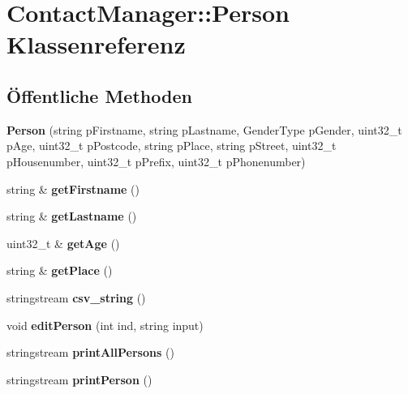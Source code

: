 \hypertarget{classContactManager_1_1Person}{}\section{Contact\+Manager\+:\+:Person Klassenreferenz}
\label{classContactManager_1_1Person}
\subsection*{Öffentliche Methoden}
\begin{DoxyCompactItemize}
\item 
\mbox{\label{classContactManager_1_1Person_ab1082b4e670d792fa0e7089a1834f2a2}} 
{\bfseries Person} (string p\+Firstname, string p\+Lastname, Gender\+Type p\+Gender, uint32\+\_\+t p\+Age, uint32\+\_\+t p\+Postcode, string p\+Place, string p\+Street, uint32\+\_\+t p\+Housenumber, uint32\+\_\+t p\+Prefix, uint32\+\_\+t p\+Phonenumber)
\item 
\mbox{\label{classContactManager_1_1Person_abaf0c8225bed1c63d3fc8edf39c091cb}} 
string \& {\bfseries get\+Firstname} ()
\item 
\mbox{\label{classContactManager_1_1Person_a7be599e567469609abc206c4e20b1ef3}} 
string \& {\bfseries get\+Lastname} ()
\item 
\mbox{\label{classContactManager_1_1Person_a785d2a902e5fb396adf21e3a69718edd}} 
uint32\+\_\+t \& {\bfseries get\+Age} ()
\item 
\mbox{\label{classContactManager_1_1Person_abc73080d9a92362af3ef25183d7186e5}} 
string \& {\bfseries get\+Place} ()
\item 
\mbox{\label{classContactManager_1_1Person_a3bc1692664e68de81b431caa6a77510b}} 
stringstream {\bfseries csv\+\_\+string} ()
\item 
\mbox{\label{classContactManager_1_1Person_a90d0e64d4db9d19843a343c6f9564555}} 
void {\bfseries edit\+Person} (int ind, string input)
\item 
\mbox{\label{classContactManager_1_1Person_a781616d2e1b0ebe4601b3914d4a03bc3}} 
stringstream {\bfseries print\+All\+Persons} ()
\item 
\mbox{\label{classContactManager_1_1Person_ab1be17c0aac5d094a6fd94d9e1fa7ed4}} 
stringstream {\bfseries print\+Person} ()
\end{DoxyCompactItemize}
